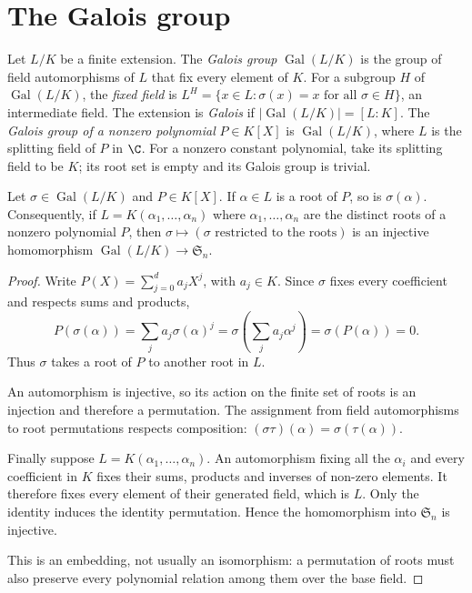 \section{The Galois group}

\begin{definition}\label{def:galois}
Let $L/K$ be a finite extension. The \emph{Galois group} $\operatorname{Gal}(L/K)$ is the group of field automorphisms of $L$ that fix every element of $K$. For a subgroup $H$ of $\operatorname{Gal}(L/K)$, the \emph{fixed field} is $L^H=\{x\in L:\sigma(x)=x\text{ for all }\sigma\in H\}$, an intermediate field. The extension is \emph{Galois} if $|\operatorname{Gal}(L/K)|=[L:K]$. The \emph{Galois group of a nonzero polynomial} $P\in K[X]$ is $\operatorname{Gal}(L/K)$, where $L$ is the splitting field of $P$ in $\C$.
For a nonzero constant polynomial, take its splitting field to be $K$;
its root set is empty and its Galois group is trivial.
\end{definition}

\begin{lemma}\label{lem:permroots}
Let $\sigma\in\operatorname{Gal}(L/K)$ and $P\in K[X]$. If $\alpha\in L$ is a root of $P$, so is $\sigma(\alpha)$. Consequently, if $L=K(\alpha_1,\dots,\alpha_n)$ where $\alpha_1,\dots,\alpha_n$ are the distinct roots of a nonzero polynomial $P$, then $\sigma\mapsto(\sigma\text{ restricted to the roots})$ is an injective homomorphism $\operatorname{Gal}(L/K)\to\mathfrak S_n$.
\end{lemma}
\begin{proof}
Write $P(X)=\sum_{j=0}^d a_jX^j$, with $a_j\in K$.
Since $\sigma$ fixes every coefficient and respects sums and
products,
\[
P(\sigma(\alpha))
=\sum_j a_j\sigma(\alpha)^j
=\sigma\left(\sum_j a_j\alpha^j\right)
=\sigma(P(\alpha))=0.
\]
Thus $\sigma$ takes a root of $P$ to another root in $L$.

An automorphism is injective, so its action on the finite
set of roots is an injection and therefore a permutation.
The assignment from field automorphisms to root permutations
respects composition: $(\sigma\tau)(\alpha)=
\sigma(\tau(\alpha))$.

Finally suppose $L=K(\alpha_1,\ldots,\alpha_n)$.
An automorphism fixing all the $\alpha_i$ and every
coefficient in $K$ fixes their sums, products and
inverses of non-zero elements. It therefore fixes
every element of their generated field, which is $L$.
Only the identity induces the identity permutation.
Hence the homomorphism into $\mathfrak S_n$ is injective.

This is an embedding, not usually an isomorphism:
a permutation of roots must also preserve every
polynomial relation among them over the base field.
\end{proof}

